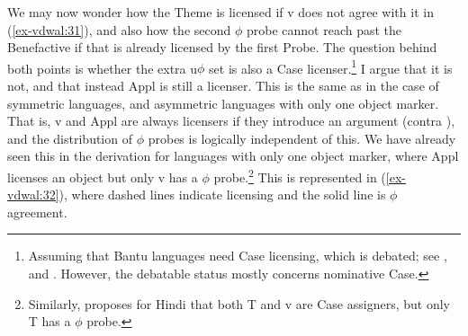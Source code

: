 \documentclass[output=paper
,modfonts
,nonflat]{langsci/langscibook}
\begin{document}
\begin{figure}[!h]
\begin{exe}
\end{exe} \vspace{-2.2cm}
\end{figure}  
We may now wonder how the Theme is licensed if v does not agree with it in (\ref{ex-vdwal:31}), and also how the second $\phi$ probe cannot reach past the Benefactive if that is already licensed by the first Probe. The question behind both points is whether the extra u$\phi$ set is also a Case licenser.\footnote{Assuming that Bantu languages need Case licensing, which is debated; see \citet{Diercks2012}, \citet{Van_der_Wal2015} and \citet{Sheehan-vdwaltap}. However, the debatable status mostly concerns nominative Case.} I argue that it is not, and that instead Appl is still a licenser. This is the same as in the case of symmetric languages, and asymmetric languages with only one object marker. That is, v and Appl are always licensers if they introduce an argument (contra \citealt{Woolford1995}), and the distribution of $\phi$ probes is logically independent of this. We have already seen this in the derivation for languages with only one object marker, where Appl licenses an object but only v has a $\phi$ probe.\footnote{Similarly, \citet{Bhatt2005} proposes for Hindi that both T and v are Case assigners, but only T has a $\phi$ probe.} \newpage\noindent This is represented in (\ref{ex-vdwal:32}), where dashed lines indicate licensing and the solid line is $\phi$ agreement.
\end{document}
